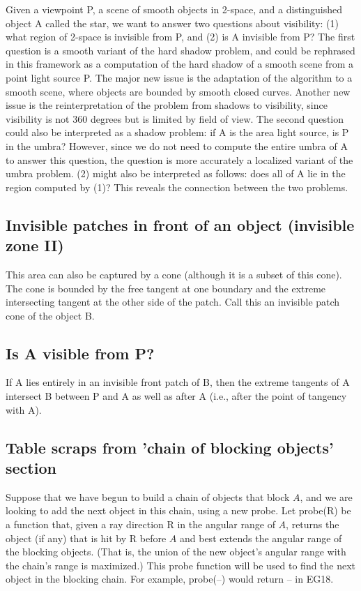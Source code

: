 \documentclass[12pt]{article}
\newcommand{\hero}{star}
\begin{document}
Given a viewpoint P, a scene of smooth objects in 2-space, and a distinguished object A
called the \hero, we want to answer two questions about visibility:
(1) what region of 2-space is invisible from P, and 
(2) is A invisible from P?
The first question is a smooth variant of the hard shadow problem,
and could be rephrased in this framework as a computation of the hard shadow
of a smooth scene from a point light source P.
The major new issue is the adaptation of the algorithm to a smooth scene, where
objects are bounded by smooth closed curves.
Another new issue is the reinterpretation of the problem from shadows to visibility,
since visibility is not 360 degrees but is limited by field of view.
The second question could also be interpreted as a shadow problem: if A is the area
light source, is P in the umbra?
However, since we do not need to compute the entire umbra of A to answer this question,
the question is more accurately a localized variant of the umbra problem.
(2) might also be interpreted as follows: does all of A lie in the region computed by (1)?
This reveals the connection between the two problems.

\subsection{Invisible patches in front of an object (invisible zone II)}

This area can also be captured by a cone (although it is a subset of this cone).
The cone is bounded by the free tangent at one boundary and the extreme
intersecting tangent at the other side of the patch.
Call this an invisible patch cone of the object B.

\subsection{Is A visible from P?}

If A lies entirely in an invisible front patch of B, 
then the extreme tangents of A intersect B between P and A as well as
after A (i.e., after the point of tangency with A).

\subsection{Table scraps from 'chain of blocking objects' section}

Suppose that we have begun to build a chain of objects that block $A$,
and we are looking to add the next object in this chain, using a new probe.
Let probe(R) be a function that, given a ray direction R in the angular range of $A$,
returns the object (if any) that is hit by R before $A$
and best extends the angular range of the blocking objects.
(That is, the union of the new object's angular range with the chain's range 
is maximized.)
This probe function will be used to find the next object in the blocking chain.
For example, probe(--) would return -- in EG18.
\end{document}
